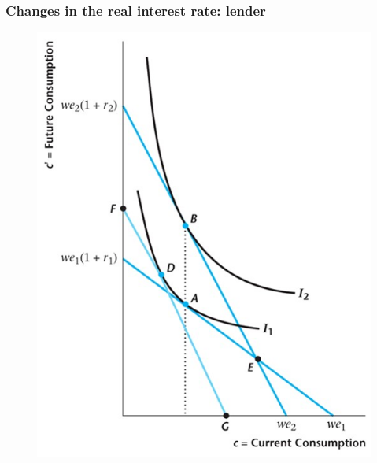 \documentclass{beamer}
\begin{document}
\begin{frame}
\frametitle[alignment=center]{Changes in the real interest rate: lender}
\begin{figure}
\centering
\includegraphics[scale=0.5]{Figures/W_Fig_9pt13.png}
\end{figure}
\end{frame}
\end{document}
